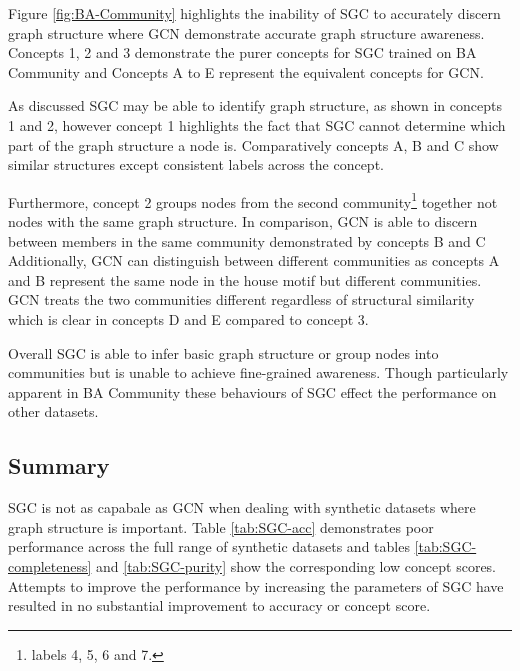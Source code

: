 Figure \ref{fig:BA-Community} highlights the inability of SGC to accurately discern graph structure where GCN demonstrate accurate graph structure awareness.
Concepts 1, 2 and 3 demonstrate the purer concepts for SGC trained on BA Community and Concepts A to E represent the equivalent concepts for GCN.

As discussed SGC may be able to identify graph structure, as shown in concepts 1 and 2, however concept 1 highlights the fact that SGC cannot determine which part of the graph structure a node is.
Comparatively concepts A, B and C show similar structures except consistent labels across the concept.

Furthermore, concept 2 groups nodes from the second community\footnote{labels 4, 5, 6 and 7.} together not nodes with the same graph structure.
In comparison, GCN is able to discern between members in the same community demonstrated by concepts B and C
Additionally, GCN can distinguish between different communities as concepts A and B represent the same node in the house motif but different communities.
GCN treats the two communities different regardless of structural similarity which is clear in concepts D and E compared to concept 3.

Overall SGC is able to infer basic graph structure or group nodes into communities but is unable to achieve fine-grained awareness.
Though particularly apparent in BA Community these behaviours of SGC effect the performance on other datasets.

\subsection{Summary}

SGC is not as capabale as GCN when dealing with synthetic datasets where graph structure is important.
Table \ref{tab:SGC-acc} demonstrates poor performance across the full range of synthetic datasets and tables \ref{tab:SGC-completeness} and \ref{tab:SGC-purity} show the corresponding low concept scores.
Attempts to improve the performance by increasing the parameters of SGC have resulted in no substantial improvement to accuracy or concept score.

